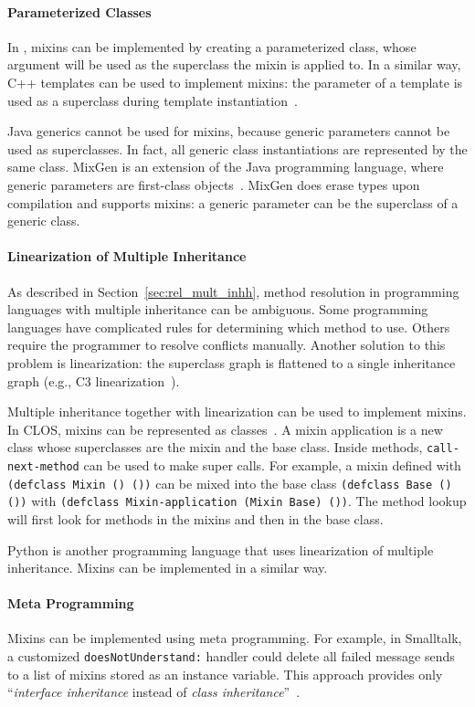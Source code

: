 \paragraph{Parameterized Classes}
In \msname, mixins can be implemented by creating a parameterized class, whose argument will be used as the superclass the mixin is applied to. In a similar way, C++ templates can be used to implement mixins: the parameter of a template is used as a superclass during template instantiation~\cite{mixinbasedcpp, nestedinterfaces}. 

Java generics cannot be used for mixins, because generic parameters cannot be used as superclasses. In fact, all generic class instantiations are represented by the same class. MixGen is an extension of the Java programming language, where generic parameters are first-class objects~\cite{Allen:2003:FAG:949305.949316}. MixGen does erase types upon compilation and supports mixins: a generic parameter can be the superclass of a generic class.

\paragraph{Linearization of Multiple Inheritance}
As described in Section~\ref{sec:rel_mult_inhh}, method resolution in programming languages with multiple inheritance can be ambiguous. Some programming languages have complicated rules for determining which method to use. Others require the programmer to resolve conflicts manually. Another solution to this problem is linearization: the superclass graph is flattened to a single inheritance graph (e.g., C3 linearization~\cite{pythonmro23}).

Multiple inheritance together with linearization can be used to implement mixins. In CLOS, mixins can be represented as classes~\cite{Smaragdakis:1998:ILD:646155.679703}. A mixin application is a new class whose superclasses are the mixin and the base class. Inside methods, \texttt{call-next-method} can be used to make super calls. For example, a mixin defined with \texttt{(defclass Mixin () ())} can be mixed into the base class \texttt{(defclass Base () ())} with \texttt{(defclass Mixin-application (Mixin Base) ())}. The method lookup will first look for methods in the mixins and then in the base class.

Python is another programming language that uses linearization of multiple inheritance. Mixins can be implemented in a similar way.

\paragraph{Meta Programming}
Mixins can be implemented using meta programming. For example, in Smalltalk, a customized \texttt{doesNotUnderstand:} handler could delete all failed message sends to a list of mixins stored as an instance variable. This approach provides only ``\emph{interface inheritance} instead of \emph{class inheritance}''~\cite{montlick1996implementing}.

